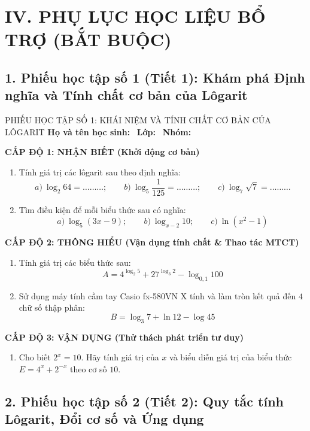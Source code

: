 \documentclass[12pt, a4paper]{article}
\begin{document}
\vspace{10pt}

\section*{IV. PHỤ LỤC HỌC LIỆU BỔ TRỢ (BẮT BUỘC)}

\subsection*{1. Phiếu học tập số 1 (Tiết 1): Khám phá Định nghĩa và Tính chất cơ bản của Lôgarit}

\begin{pedabox}{PHIẾU HỌC TẬP SỐ 1: KHÁI NIỆM VÀ TÍNH CHẤT CƠ BẢN CỦA LÔGARIT}
\textbf{Họ và tên học sinh:} \dotfill \ \textbf{Lớp:} \dotfill \ \textbf{Nhóm:} \dotfill

\noindent \textbf{CẤP ĐỘ 1: NHẬN BIẾT (Khởi động cơ bản)}
\begin{enumerate}[leftmargin=0.6cm]
    \item Tính giá trị các lôgarit sau theo định nghĩa:
    $$a) \ \log_2 64 = \dots\dots\dots; \qquad b) \ \log_5 \dfrac{1}{125} = \dots\dots\dots; \qquad c) \ \log_7 \sqrt{7} = \dots\dots\dots$$
    \item Tìm điều kiện để mỗi biểu thức sau có nghĩa:
    $$a) \ \log_5 (3x - 9); \qquad b) \ \log_{x - 2} 10; \qquad c) \ \ln(x^2 - 1)$$
\end{enumerate}

\noindent \textbf{CẤP ĐỘ 2: THÔNG HIỂU (Vận dụng tính chất \& Thao tác MTCT)}
\begin{enumerate}[leftmargin=0.6cm]
    \item Tính giá trị các biểu thức sau:
    $$A = 4^{\log_2 5} + 27^{\log_3 2} - \log_{0{,}1} 100$$
    \item Sử dụng máy tính cầm tay Casio fx-580VN X tính và làm tròn kết quả đến $4$ chữ số thập phân:
    $$B = \log_3 7 + \ln 12 - \log 45$$
\end{enumerate}

\noindent \textbf{CẤP ĐỘ 3: VẬN DỤNG (Thử thách phát triển tư duy)}
\begin{enumerate}[leftmargin=0.6cm]
    \item Cho biết $2^x = 10$. Hãy tính giá trị của $x$ và biểu diễn giá trị của biểu thức $E = 4^x + 2^{-x}$ theo cơ số $10$.
\end{enumerate}
\end{pedabox}

\subsection*{2. Phiếu học tập số 2 (Tiết 2): Quy tắc tính Lôgarit, Đổi cơ số và Ứng dụng}
\end{document}
